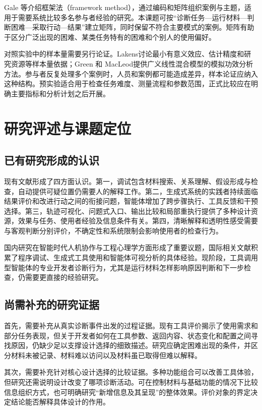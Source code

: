 Gale 等\cite{gale2013framework}介绍框架法（framework method），通过编码和矩阵组织案例与主题，适用于需要系统比较多名参与者经验的研究。本课题可按“诊断任务—运行材料—判断困难—采取行动—结果”建立矩阵，同时保留不符合主要模式的案例。矩阵有助于区分广泛出现的困难、某类任务特有的困难和个别人的使用偏好。

对照实验中的样本量需要另行论证。Lakens\cite{ref67}讨论最小有意义效应、估计精度和研究资源等样本量依据；Green 和 MacLeod\cite{ref68}提供广义线性混合模型的模拟功效分析方法。参与者反复处理多个案例时，人员和案例都可能造成差异，样本论证应纳入这种结构。预实验适合用于检查任务难度、测量流程和参数范围，正式比较应在明确主要指标和分析计划之后开展。

\section{研究评述与课题定位}

\subsection{已有研究形成的认识}

现有文献形成了四方面认识。第一，调试包含材料搜索、关系理解、假设形成与检查，自动提供可疑位置仍需要人的解释工作。第二，生成式系统的实践者持续面临结果评价和改进行动之间的衔接问题，智能体增加了跨步骤执行、工具反馈和干预选择。第三，轨迹可视化、问题式入口、输出比较和局部重执行提供了多种设计资源，效果与任务、使用者经验及信息条件有关。第四，清晰解释和透明性感受需要与客观判断分别评价，不确定性和系统限制会影响使用者的检查行为。

国内研究在智能时代人机协作与工程心理学方面形成了重要议题，国际相关文献积累了程序调试、生成式工具使用和智能体可视分析的具体经验。现阶段，工具调用型智能体的专业开发者诊断行为，尤其是运行材料怎样影响原因判断和下一步检查，仍需要更直接的经验研究。

\subsection{尚需补充的研究证据}

首先，需要补充从真实诊断事件出发的过程证据。现有工具评价揭示了使用需求和部分任务表现，但关于开发者如何在工具参数、返回内容、状态变化和配置之间寻找原因，仍缺少足以支撑设计选择的细致描述。研究应确定困难出现的条件，并区分材料未被记录、材料难以访问以及材料虽已取得但难以解释。

其次，需要补充针对核心设计选择的比较证据。多种功能组合可以改善工具体验，但研究还需说明设计改变了哪项诊断活动。可在控制材料与基础功能的情况下比较信息组织方式，也可明确研究“新增信息及其呈现”的整体效果。评价对象的界定决定结论能否解释具体设计的作用。

